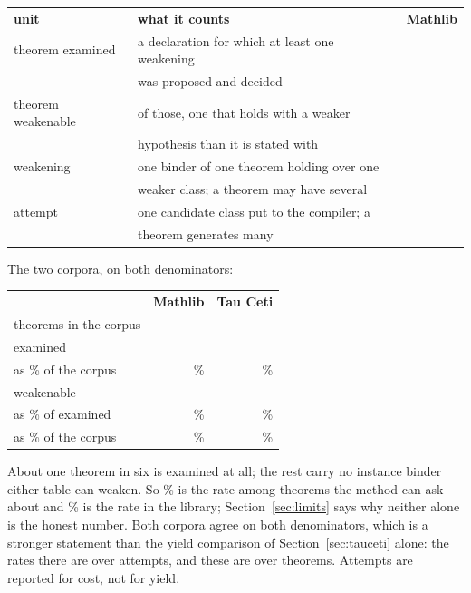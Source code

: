 \documentclass[11pt]{article}
\begin{document}
\begin{center}
\begin{tabular}{llr}
\textbf{unit} & \textbf{what it counts} & \textbf{Mathlib}\\[2pt]
theorem examined & a declaration for which at least one weakening & \\
                 & was proposed and decided & \theoremsExamined{}\\[2pt]
theorem weakenable & of those, one that holds with a weaker & \\
                   & hypothesis than it is stated with & \theoremsWeakened{}\\[2pt]
weakening & one binder of one theorem holding over one & \\
          & weaker class; a theorem may have several & \allSurvivors{}\\[2pt]
attempt & one candidate class put to the compiler; a & \\
        & theorem generates many & \allAttempts{}\\
\end{tabular}
\end{center}

The two corpora, on both denominators:

\begin{center}
\begin{tabular}{lrr}
 & \textbf{Mathlib} & \textbf{Tau Ceti}\\[2pt]
theorems in the corpus      & \mathlibTheorems{} & \tauTheorems{}\\
examined                    & \theoremsExamined{} & \tauExamined{}\\
\quad as \% of the corpus   & \mathlibExaminedPercent{}\% & \tauExaminedPercent{}\%\\[2pt]
weakenable                  & \theoremsWeakened{} & \tauWeakenable{}\\
\quad as \% of examined     & \theoremRate{}\% & \tauOfExaminedPercent{}\%\\
\quad as \% of the corpus   & \mathlibWeakenablePercent{}\% & \tauWeakenablePercent{}\%\\
\end{tabular}
\end{center}

About one theorem in six is examined at all; the rest carry no instance binder
either table can weaken. So \theoremRate{}\% is the rate among theorems the
method can ask about and \mathlibWeakenablePercent{}\% is the rate in the
library; Section~\ref{sec:limits} says why neither alone is the honest number.
Both corpora agree on both denominators, which is a stronger statement than the
yield comparison of Section~\ref{sec:tauceti} alone: the rates there are over
attempts, and these are over theorems. Attempts are reported for cost, not for
yield.
\end{document}
